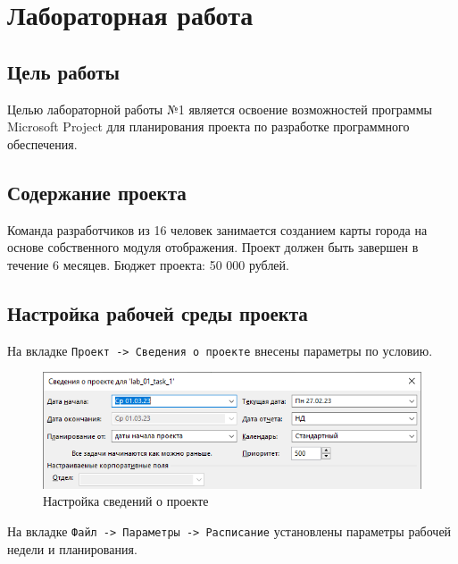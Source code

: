\chapter{Лабораторная работа}

\section{Цель работы}

Целью лабораторной работы №1 является освоение возможностей программы Microsoft Project для планирования проекта по разработке программного обеспечения.

\section{Содержание проекта}

Команда разработчиков из 16 человек занимается созданием карты города на основе собственного модуля отображения. Проект должен быть завершен в течение 6 месяцев. Бюджет проекта: 50 000 рублей.

\section{Настройка рабочей среды проекта}

На вкладке \texttt{Проект -> Сведения о проекте} внесены параметры по условию.

\begin{figure}[H]
	\begin{center}
		\includegraphics[scale=0.8]{imgs/task_1_0.png}
	\end{center}
	\caption{Настройка сведений о проекте}
	\label{img:label}
\end{figure}

На вкладке \texttt{Файл -> Параметры -> Расписание} установлены параметры рабочей недели и планирования.

